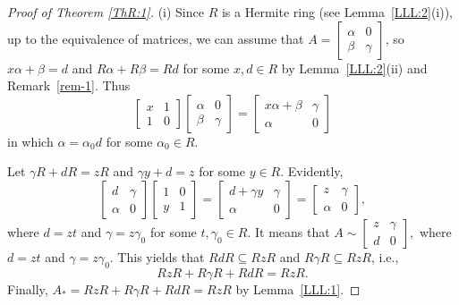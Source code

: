 \documentclass{cimart}
\begin{document}
\begin{proof}[Proof of Theorem \ref{ThR:1}]
(i) Since $R$ is a Hermite ring (see Lemma~\ref{LLL:2}(i)),  up to the equivalence of matrices, we can assume   that $A=\left[\begin{array}{cc}
          \alpha & 0 \\
          \beta & \gamma
\end{array}
\right]$, so  $x\alpha+\beta=d$ and  $R\alpha+R\beta=Rd$ for some $x,d \in R$ by  Lemma~\ref{LLL:2}(ii) and Remark~\ref{rem-1}. Thus
\[
        \left[\begin{array}{cc}
          x & 1 \\
          1 & 0
        \end{array}\right]\left[\begin{array}{cc}
          \alpha & 0 \\
          \beta & \gamma
        \end{array}\right]=\left[\begin{array}{cc}
          x\alpha+\beta & \gamma \\
          \alpha & 0
        \end{array}\right]
\]
in which  $\alpha=\alpha_0d$ for some $\alpha_0\in R$.

Let $\gamma R+d R=zR$ and $\gamma y+d=z$ for some $y\in R$. Evidently,
\[
        \left[\begin{array}{cc}
          d & \gamma \\
          \alpha & 0
        \end{array}\right]\left[\begin{array}{cc}
          1 & 0 \\
          y & 1
        \end{array}\right]=\left[\begin{array}{cc}
          d+\gamma y & \gamma \\
          \alpha & 0
        \end{array}\right]=\left[\begin{array}{cc}
          z & \gamma \\
          \alpha & 0
        \end{array}\right],
\]
where $d=zt$ and  $\gamma=z\gamma_0$ for some $t,\gamma_0\in R$. It means that  $A\sim  \left[\begin{array}{cc}
          z & \gamma \\
          d & 0
\end{array}
\right],$
where $d=zt$ and $\gamma=z\gamma_0$. This yields  that $Rd R\subseteq RzR$ and $R\gamma R\subseteq RzR$, i.e.,
\[
RzR+R\gamma R+Rd R=RzR.
\]
Finally,   $A_*=RzR+R\gamma R+Rd R=RzR$ by Lemma~\ref{LLL:1}.


\end{proof}
\end{document}
